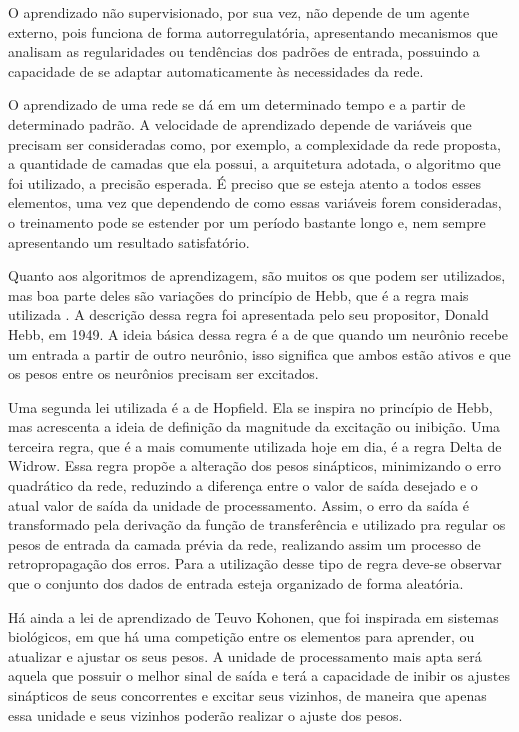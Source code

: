 O aprendizado não supervisionado, por sua vez, não depende de um agente externo, pois funciona de forma autorregulatória, apresentando 
mecanismos que analisam as regularidades ou tendências dos padrões de entrada, possuindo a capacidade de se adaptar automaticamente às 
necessidades da rede. 

O aprendizado de uma rede se dá em um determinado tempo e a partir de determinado padrão. 
A velocidade de aprendizado depende de variáveis que precisam ser consideradas como, por exemplo, a complexidade da rede proposta, 
a quantidade de camadas que ela possui, a arquitetura adotada, o algoritmo que foi utilizado, a precisão esperada. 
É preciso que se esteja atento a todos esses elementos, uma vez que dependendo de como essas variáveis forem consideradas, 
o treinamento pode se estender por um período bastante longo e, nem sempre apresentando um resultado satisfatório.

Quanto aos algoritmos de aprendizagem, são muitos os que podem ser utilizados, mas boa parte deles são variações do princípio de Hebb, 
que é a regra mais utilizada \cite{Barreto2002}. A descrição dessa regra foi apresentada pelo seu propositor, Donald Hebb, em 1949. 
A ideia básica dessa regra é a de que quando um neurônio recebe um entrada a partir de outro neurônio, isso significa que ambos 
estão ativos e que os pesos entre os neurônios precisam ser excitados.

Uma segunda lei utilizada é a de Hopfield. Ela se inspira no princípio de Hebb, mas acrescenta a ideia de definição da magnitude da 
excitação ou inibição. Uma terceira regra, que é a mais comumente utilizada hoje em dia, é a regra Delta de Widrow. 
Essa regra propõe a alteração dos pesos sinápticos, minimizando o erro quadrático da rede, reduzindo a diferença entre o valor de saída 
desejado e o atual valor de saída da unidade de processamento. 
Assim, o erro da saída é transformado pela derivação da função de transferência e utilizado pra regular os pesos de entrada da camada 
prévia da rede, realizando assim um processo de retropropagação dos erros. 
Para a utilização desse tipo de regra deve-se observar que o conjunto dos dados de entrada esteja organizado de forma aleatória. 

Há ainda a lei de aprendizado de Teuvo Kohonen, que foi inspirada em sistemas biológicos, em que há uma competição entre os elementos 
para aprender, ou atualizar e ajustar os seus pesos. A unidade de processamento mais apta será aquela que possuir o melhor sinal de 
saída e terá a capacidade de inibir os ajustes sinápticos de seus concorrentes e excitar seus vizinhos, de maneira que apenas essa 
unidade e seus vizinhos poderão realizar o ajuste dos pesos.

